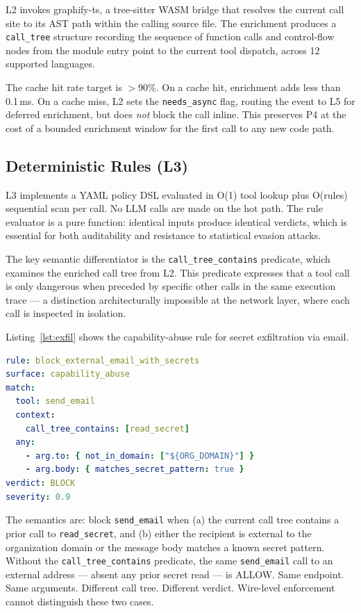 \documentclass[conference]{IEEEtran}
\begin{document}
L2 invokes graphify-ts, a tree-sitter WASM bridge that resolves the
current call site to its AST path within the calling source file. The
enrichment produces a \texttt{call\_tree} structure recording the sequence
of function calls and control-flow nodes from the module entry point to
the current tool dispatch, across 12 supported languages.

The cache hit rate target is $>$90\%. On a cache hit, enrichment adds
less than 0.1\,ms. On a cache miss, L2 sets the \texttt{needs\_async}
flag, routing the event to L5 for deferred enrichment, but does
\textit{not} block the call inline. This preserves P4 at the cost of a
bounded enrichment window for the first call to any new code path.

\subsection{Deterministic Rules (L3)}

L3 implements a YAML policy DSL evaluated in O(1) tool lookup plus
O(rules) sequential scan per call. No LLM calls are made on the hot path.
The rule evaluator is a pure function: identical inputs produce identical
verdicts, which is essential for both auditability and resistance to
statistical evasion attacks.

The key semantic differentiator is the \texttt{call\_tree\_contains}
predicate, which examines the enriched call tree from L2. This predicate
expresses that a tool call is only dangerous when preceded by specific
other calls in the same execution trace --- a distinction architecturally
impossible at the network layer, where each call is inspected in isolation.

Listing~\ref{lst:exfil} shows the capability-abuse rule for secret
exfiltration via email.

\begin{lstlisting}[language=yaml,
  caption={Capability-abuse rule: block secret exfiltration via email.},
  label={lst:exfil}]
rule: block_external_email_with_secrets
surface: capability_abuse
match:
  tool: send_email
  context:
    call_tree_contains: [read_secret]
  any:
    - arg.to: { not_in_domain: ["${ORG_DOMAIN}"] }
    - arg.body: { matches_secret_pattern: true }
verdict: BLOCK
severity: 0.9
\end{lstlisting}

The semantics are: block \texttt{send\_email} when (a) the current call
tree contains a prior call to \texttt{read\_secret}, and (b) either the
recipient is external to the organization domain or the message body
matches a known secret pattern. Without the \texttt{call\_tree\_contains}
predicate, the same \texttt{send\_email} call to an external address ---
absent any prior secret read --- is ALLOW. Same endpoint. Same arguments.
Different call tree. Different verdict. Wire-level enforcement cannot
distinguish these two cases.
\end{document}
